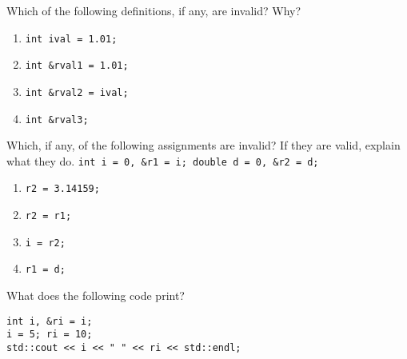 %
%
\begin{question}
Which of the following definitions, if any, are invalid? Why?
\begin{enumerate}[label=(\alph*)]
^^I\item \verb|int ival = 1.01;|
^^I\item \verb|int &rval1 = 1.01;|
^^I\item \verb|int &rval2 = ival;|
^^I\item \verb|int &rval3;|
\end{enumerate}
\end{question}

\begin{question}
Which, if any, of the following assignments are invalid? If they are valid, explain what they do.
\verb|int i = 0, &r1 = i; double d = 0, &r2 = d;|
\begin{enumerate}[label=(\alph*)]
^^I\item \verb|r2 = 3.14159;|
^^I\item \verb|r2 = r1;|
^^I\item \verb|i = r2;|
^^I\item \verb|r1 = d;|
\end{enumerate}
\end{question}

\begin{question}
What does the following code print?
\begin{lstlisting}
int i, &ri = i;
i = 5; ri = 10;
std::cout << i << " " << ri << std::endl;
\end{lstlisting}
\end{question}
